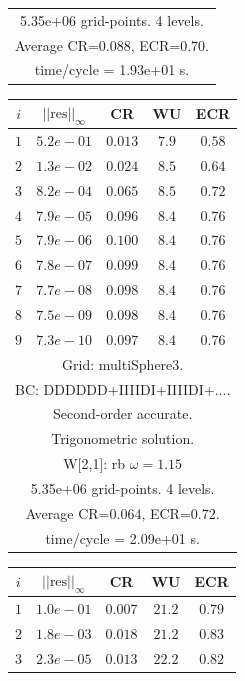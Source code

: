 \begin{table}[hbt]
\begin{center}
{\begin{tabular}{|c|c|c|c|c|}
\multicolumn{5}{|c|}{5.35e+06 grid-points. 4 levels.}  \\
\multicolumn{5}{|c|}{Average CR=$0.088$, ECR=$0.70$.}  \\
\multicolumn{5}{|c|}{time/cycle = 1.93e+01 s.}  \\
\hline 
\end{tabular}
\begin{tabular}{|c|c|c|c|c|} \hline 
 $i$   & $\vert\vert\mbox{res}\vert\vert_\infty$  &  CR     &  WU    & ECR  \\   \hline 
 $ 1$  & $ 5.2e-01$ & $0.013$ & $ 7.9$ & $0.58$ \\ 
 $ 2$  & $ 1.3e-02$ & $0.024$ & $ 8.5$ & $0.64$ \\ 
 $ 3$  & $ 8.2e-04$ & $0.065$ & $ 8.5$ & $0.72$ \\ 
 $ 4$  & $ 7.9e-05$ & $0.096$ & $ 8.4$ & $0.76$ \\ 
 $ 5$  & $ 7.9e-06$ & $0.100$ & $ 8.4$ & $0.76$ \\ 
 $ 6$  & $ 7.8e-07$ & $0.099$ & $ 8.4$ & $0.76$ \\ 
 $ 7$  & $ 7.7e-08$ & $0.098$ & $ 8.4$ & $0.76$ \\ 
 $ 8$  & $ 7.5e-09$ & $0.098$ & $ 8.4$ & $0.76$ \\ 
 $ 9$  & $ 7.3e-10$ & $0.097$ & $ 8.4$ & $0.76$ \\ 
\hline 
\multicolumn{5}{|c|}{Grid: multiSphere3.}  \\
\multicolumn{5}{|c|}{BC: DDDDDD+IIIIDI+IIIIDI+....}  \\
\multicolumn{5}{|c|}{Second-order accurate.}  \\
\multicolumn{5}{|c|}{Trigonometric solution.}  \\
\multicolumn{5}{|c|}{W[2,1]: rb $\omega=1.15$}  \\
\multicolumn{5}{|c|}{5.35e+06 grid-points. 4 levels.}  \\
\multicolumn{5}{|c|}{Average CR=$0.064$, ECR=$0.72$.}  \\
\multicolumn{5}{|c|}{time/cycle = 2.09e+01 s.}  \\
\hline 
\end{tabular}
\begin{tabular}{|c|c|c|c|c|} \hline 
 $i$   & $\vert\vert\mbox{res}\vert\vert_\infty$  &  CR     &  WU    & ECR  \\   \hline 
 $ 1$  & $ 1.0e-01$ & $0.007$ & $21.2$ & $0.79$ \\ 
 $ 2$  & $ 1.8e-03$ & $0.018$ & $21.2$ & $0.83$ \\ 
 $ 3$  & $ 2.3e-05$ & $0.013$ & $22.2$ & $0.82$ \\ 

\end{tabular}}
\end{center}
\end{table}
